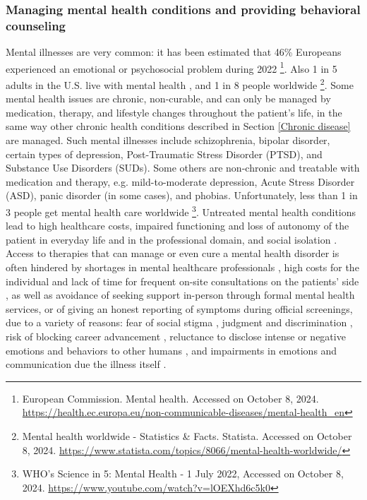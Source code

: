 \subsubsection{Managing mental health conditions and providing behavioral counseling}\label{MentalHealthRisks}
Mental illnesses are very common: it has been estimated that 46\% Europeans experienced an emotional or psychosocial problem during 2022 \footnote{European Commission. Mental health. Accessed on October 8, 2024. \url{https://health.ec.europa.eu/non-communicable-diseases/mental-health_en}}. Also 1 in 5 adults in the U.S. live with mental health \cite{nami_mental_health_numbers}, and 1 in 8 people worldwide \footnote{Mental health worldwide - Statistics \& Facts. Statista. Accessed on October 8, 2024. \url{https://www.statista.com/topics/8066/mental-health-worldwide/}}. Some mental health issues are chronic, non-curable, and can only be managed by medication, therapy, and lifestyle changes throughout the patient's life, in the same way other chronic health conditions described in Section \ref{Chronic disease} are managed. Such mental illnesses include schizophrenia, bipolar disorder, certain types of depression, Post-Traumatic Stress Disorder (PTSD), and Substance Use Disorders (SUDs). Some others are non-chronic and treatable with medication and therapy, e.g. mild-to-moderate depression, Acute Stress Disorder (ASD), panic disorder (in some cases), and phobias. Unfortunately, less than 1 in 3 people get mental health care worldwide \footnote{WHO’s Science in 5: Mental Health - 1 July 2022, Accessed on October 8, 2024. \url{https://www.youtube.com/watch?v=lOEXhd6c5k0}}. Untreated mental health conditions lead to high healthcare costs, impaired functioning and loss of autonomy of the patient in everyday life and in the professional domain, and social isolation \cite{schizophrenia2010, dementiatherapy2019, panicbot2020}. Access to therapies that can manage or even cure a mental health disorder is often hindered by shortages in mental healthcare professionals \cite{dementiatherapy2019, aipsychotherapy2019, depressioncoach2023, wysa2023, stade2024}, high costs for the individual \cite{depressioncoach2023, machinesinmentalhealth2017} and lack of time for frequent on-site consultations on the patients' side \cite{bickmoreetalrealtionalfordepression2010, dementiatherapy2019}, as well as avoidance of seeking support in-person through formal mental health services, or of giving an honest reporting of symptoms during official screenings, due to a variety of reasons: fear of social stigma \cite{schizophrenia2010, onlinementalhealth2015, alcoholism2016, woebot2017, mentalhealthbarriers2017, bickmoreetalrealtionalfordepression2010, mentalhealthandviolence2016, noblesetal2020addiction}, judgment and discrimination \cite{mentalhealthbarriers2017}, risk of blocking career advancement \cite{SimCoach2016}, reluctance to disclose intense or negative emotions and behaviors to other humans \cite{bickmoreetalrealtionalfordepression2010, willingtodisclose2014, machinesinmentalhealth2017, mdddiagnosis2017}, and impairments in emotions and communication due the illness itself \cite{schizophrenia2010}. 
